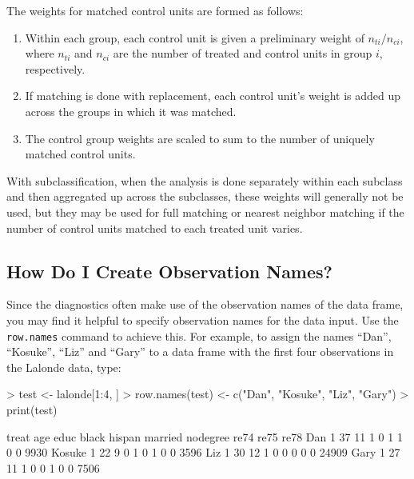 \documentclass[oneside,letterpaper,titlepage]{article}
\begin{document}
The weights for matched control units are formed as follows:
\begin{enumerate}
\item Within each group, each control unit is given a preliminary
  weight of $n_{ti}/n_{ci}$, where $n_{ti}$ and $n_{ci}$ are the
  number of treated and control units in group $i$, respectively.
\item If matching is done with replacement, each control unit's weight
  is added up across the groups in which it was matched.
\item The control group weights are scaled to sum to the number of
  uniquely matched control units.
\end{enumerate}

With subclassification, when the analysis is done separately within
each subclass and then aggregated up across the subclasses, these
weights will generally not be used, but they may be used for full
matching or nearest neighbor matching if the number of control units
matched to each treated unit varies.

\subsection{How Do I Create Observation Names?}
\label{rnames}

Since the diagnostics often make use of the observation names of the
data frame, you may find it helpful to specify observation names for
the data input.  Use the \texttt{row.names} command to achieve this.
For example, to assign the names ``Dan'', ``Kosuke'', ``Liz'' and
``Gary'' to a data frame with the first four observations in the
Lalonde data, type:

\begin{Schunk}
\begin{Sinput}
> test <- lalonde[1:4, ]
> row.names(test) <- c("Dan", "Kosuke", "Liz", "Gary")
> print(test)
\end{Sinput}
\begin{Soutput}
       treat age educ black hispan married nodegree re74 re75  re78
Dan        1  37   11     1      0       1        1    0    0  9930
Kosuke     1  22    9     0      1       0        1    0    0  3596
Liz        1  30   12     1      0       0        0    0    0 24909
Gary       1  27   11     1      0       0        1    0    0  7506
\end{Soutput}
\end{Schunk}
\end{document}
